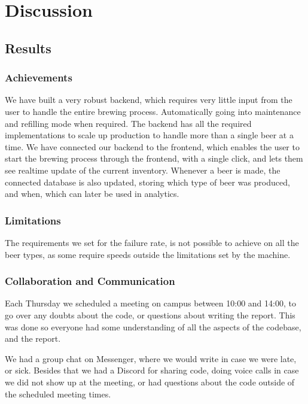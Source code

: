 \section{Discussion}

\subsection{Results}
\subsubsection{Achievements}
We have built a very robust backend, which requires very little input from the user to handle the entire brewing process. 
Automatically going into maintenance and refilling mode when required.
The backend has all the required implementations to scale up production to handle more than a single beer at a time.
We have connected our backend to the frontend, which enables the user to start the brewing process through the frontend, 
with a single click, and lets them see realtime update of the current inventory.
Whenever a beer is made, the connected database is also updated, storing which type of beer was produced, and when, which can later be used in analytics.

\subsubsection{Limitations}
The requirements we set for the failure rate,
is not possible to achieve on all the beer types,
as some require speeds outside the limitations set by the machine.

\subsubsection{Collaboration and Communication}
Each Thursday we scheduled a meeting on campus between 10:00 and 14:00,
to go over any doubts about the code, or questions about writing the report.
This was done so everyone had some understanding of all the aspects 
of the codebase, and the report.


We had a group chat on Messenger, where we would write in case we were late,
or sick.
Besides that we had a Discord for sharing code, doing voice calls in case 
we did not show up at the meeting, or had questions about the code 
outside of the scheduled meeting times.

